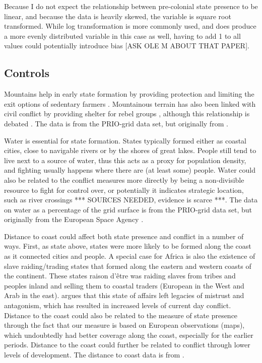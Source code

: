 \documentclass[12pt]{article}
\begin{document}
Because I do not expect the relationship between pre-colonial state presence to
be linear, and because the data is heavily skewed, the variable is square root
transformed. While log transformation is more commonly used, and does produce a
more evenly distributed variable in this case as well, having to add 1 to
all values could potentially introduce bias [ASK OLE M ABOUT THAT PAPER]. 

\subsection{Controls}

Mountains help in early state formation by providing protection and limiting the
exit options of sedentary farmers \citep{Carneiro1988}. Mountainous terrain has
also been linked with civil conflict by providing shelter for rebel groups
\citep{Hegre2006}, although this relationship is debated 
\citep{Buhaug2002}. The data is from the PRIO-grid data set, but originally 
from \citet{Blyth2002}. 

Water is essential for state formation. States typically formed either as
coastal cities, close to navigable rivers or by the shores of great lakes.
People still tend to live next to a source of water, thus this acts as a proxy
for population density, and fighting usually happens where there are (at least
some) people.  Water could also be related to the conflict measures more
directly by being a non-divisible resource to fight for control over, or
potentially it indicates strategic location, such as river crossings *** SOURCES
NEEDED, evidence is scarce ***. The data on water as a percentage of the grid
surface is from the PRIO-grid data set, but originally from the European Space
Agency \citep{Bontemps2009}.

Distance to coast could affect both state presence and conflict in a number of
ways. First, as state above, states were more likely to be formed along the
coast as it connected cities and people. A special case for Africa is also the
existence of slave raiding/trading states that formed along the eastern and
western coasts of the continent. These states raison d'être was raiding slaves
from tribes and peoples inland and selling them to coastal traders (European in
the West and Arab in the east). \citet{Nunn2008} argues that this state of
affairs left legacies of mistrust and antagonism, which has resulted in
increased levels of current day conflict. Distance to the coast could also be
related to the measure of state presence through the fact that our measure is
based on European observations (maps), which undoubtedly had better coverage
along the coast, especially for the earlier periods. Distance to the coast could
further be related to conflict through lower levels of development. The distance
to coast data is from \citet{Wessel1996}.
\end{document}

